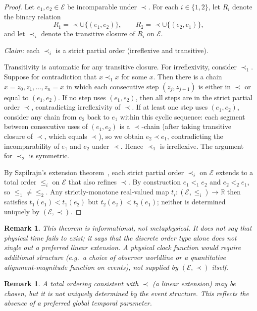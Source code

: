 \documentclass[12pt]{article}
\newtheorem{remark}[theorem]{Remark}
\newcommand{\Ecal}{\mathcal{E}}
\begin{document}
\begin{proof}
Let $e_1, e_2 \in \Ecal$ be incomparable under $\prec$. For each $i \in \{1, 2\}$, let $R_i$ denote the binary relation
\[
  R_1 = \prec \cup \{(e_1, e_2)\}, \qquad R_2 = \prec \cup \{(e_2, e_1)\},
\]
and let $\prec_i$ denote the transitive closure of $R_i$ on $\Ecal$.

\emph{Claim:} each $\prec_i$ is a strict partial order (irreflexive and transitive).

Transitivity is automatic for any transitive closure. For irreflexivity, consider $\prec_1$. Suppose for contradiction that $x \prec_1 x$ for some $x$. Then there is a chain $x = z_0, z_1, \ldots, z_n = x$ in which each consecutive step $(z_j, z_{j+1})$ is either in $\prec$ or equal to $(e_1, e_2)$. If no step uses $(e_1, e_2)$, then all steps are in the strict partial order $\prec$, contradicting irreflexivity of $\prec$. If at least one step uses $(e_1, e_2)$, consider any chain from $e_2$ back to $e_1$ within this cyclic sequence: each segment between consecutive uses of $(e_1, e_2)$ is a $\prec$-chain (after taking transitive closure of $\prec$, which equals $\prec$), so we obtain $e_2 \prec e_1$, contradicting the incomparability of $e_1$ and $e_2$ under $\prec$. Hence $\prec_1$ is irreflexive. The argument for $\prec_2$ is symmetric.

By Szpilrajn's extension theorem~\citep{Szpilrajn1930}, each strict partial order $\prec_i$ on $\Ecal$ extends to a total order $\leq_i$ on $\Ecal$ that also refines $\prec$. By construction $e_1 <_1 e_2$ and $e_2 <_2 e_1$, so $\leq_1 \neq \leq_2$. Any strictly-monotone real-valued map $t_i : (\Ecal, \leq_i) \to \mathbb{R}$ then satisfies $t_1(e_1) < t_1(e_2)$ but $t_2(e_2) < t_2(e_1)$; neither is determined uniquely by $(\Ecal, \prec)$.
\end{proof}

\begin{remark}
This theorem is informational, not metaphysical. It does not say that physical time fails to exist; it says that the discrete order type alone does not single out a preferred linear extension. A physical clock function would require additional structure (e.g.\ a choice of observer worldline or a quantitative alignment-magnitude function on events), not supplied by $(\Ecal, \prec)$ itself.
\end{remark}

\begin{remark}
A total ordering consistent with $\prec$ (a linear extension) may be chosen, but it is not uniquely determined by the event structure. This reflects the absence of a preferred global temporal parameter.
\end{remark}
\end{document}
